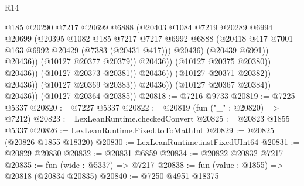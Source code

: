 \begin{lexlean}{R14}
\begin{coremodule}
                                              @185
                                              @20290
                                              @7217
                                              @20699
                                              @6888
                                              (@20403
                                                @1084
                                                @7219
                                                @20289
                                                @6994
                                                @20699
                                                (@20395
                                                  @1082
                                                  @185
                                                  @7217
                                                  @7217
                                                  @6992
                                                  @6888
                                                  (@20418
                                                    @417
                                                    @7001
                                                    @163
                                                    @6992
                                                    @20429
                                                    (@7383 (@20431 @417)))
                                                  @20436)
                                                (@20439 @6991))
                                              @20436))
                                          (@10127 @20377 @20379))
                                        @20436))
                                    (@10127 @20375 @20380))
                                  @20436))
                              (@10127 @20373 @20381))
                            @20436))
                        (@10127 @20371 @20382))
                      @20436))
                  (@10127 @20369 @20383))
                @20436))
            (@10127 @20367 @20384))
          @20436))
      (@10127 @20364 @20385))
@20818 := @7216 @9733
@20819 := @7225 @5337
@20820 := @7227 @5337
@20822 := @20819 (fun ("_" : @20820) => @7212)
@20823 := LexLeanRuntime.checkedConvert
@20825 := @20823 @1855 @5337
@20826 := LexLeanRuntime.Fixed.toToMathInt
@20829 := @20825 (@20826 @1855 @18320)
@20830 := LexLeanRuntime.instFixedUInt64
@20831 := @20829 @20830
@20832 := @20831 @6859
@20834 := @20822 @20832 @7217
@20835 := fun (wide : @5337) => @7217
@20838 := fun (value : @1855) => @20818 (@20834 @20835)
@20840 := @7250 @4951 @18375

\end{coremodule}
\end{lexlean}
